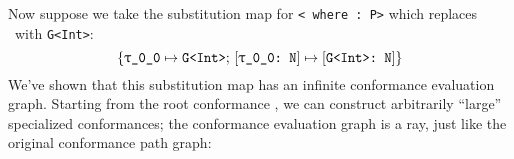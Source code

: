 \documentclass[../generics]{subfiles}
\begin{document}
Now suppose we take the substitution map for \texttt{<\rT\ where \rT:\ P>} which replaces \rT\ with \texttt{G<Int>}:
\[\SubstMapC{\SubstType{\rT}{G<Int>}}{\SubstConf{\rT}{G<Int>}{N}}\]
We've shown that this substitution map has an infinite conformance evaluation graph. Starting from the root conformance , we can construct arbitrarily ``large'' specialized conformances; the conformance evaluation graph is a ray, just like the original conformance path graph:
\begin{center}
\end{center}
\end{document}
